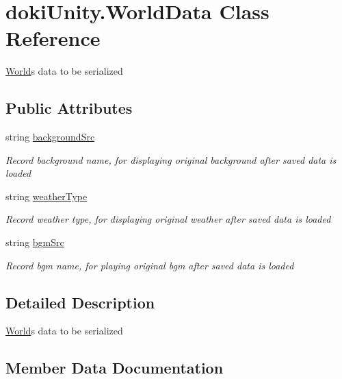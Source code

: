 \hypertarget{classdoki_unity_1_1_world_data}{}\section{doki\+Unity.\+World\+Data Class Reference}
\label{classdoki_unity_1_1_world_data}


\hyperlink{classdoki_unity_1_1_world}{World}\textquotesingle{}s data to be serialized  


\subsection*{Public Attributes}
\begin{DoxyCompactItemize}
\item 
string \hyperlink{classdoki_unity_1_1_world_data_a2447e6d10e01eefcd655ea1ec9a21bf7}{background\+Src}
\begin{DoxyCompactList}\small\item\em Record background name, for displaying original background after saved data is loaded \end{DoxyCompactList}\item 
string \hyperlink{classdoki_unity_1_1_world_data_a96b2cbfa143cff7922f02bb4c8fb0f38}{weather\+Type}
\begin{DoxyCompactList}\small\item\em Record weather type, for displaying original weather after saved data is loaded \end{DoxyCompactList}\item 
string \hyperlink{classdoki_unity_1_1_world_data_ad4f271186461614e00dd6b33e7fde52c}{bgm\+Src}
\begin{DoxyCompactList}\small\item\em Record bgm name, for playing original bgm after saved data is loaded \end{DoxyCompactList}\end{DoxyCompactItemize}


\subsection{Detailed Description}
\hyperlink{classdoki_unity_1_1_world}{World}\textquotesingle{}s data to be serialized 



\subsection{Member Data Documentation}
